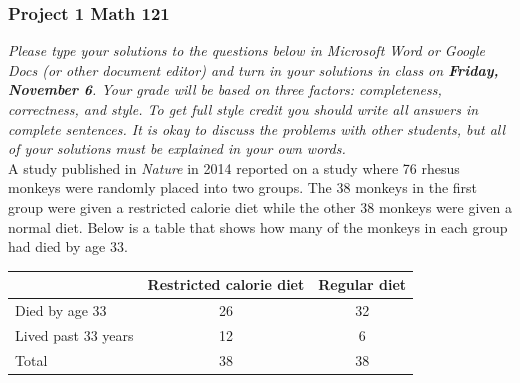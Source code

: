\documentclass[12pt]{exam}
\begin{document}
\subsubsection*{Project 1 \hfill Math 121}

\textit{Please type your solutions to the questions below in Microsoft Word or Google Docs (or other document editor) and turn in your solutions in class on \textbf{Friday, November 6}. Your grade will be based on three factors: completeness, correctness, and style. To get full style credit you should write all answers in complete sentences. It is okay to discuss the problems with other students, but all of your solutions must be explained in your own words. }  \\


A study published in \emph{Nature} in 2014 reported on a study where 76 rhesus monkeys were randomly placed into two groups. The 38 monkeys in the first group were given a restricted calorie diet while the other 38 monkeys were given a normal diet.  Below is a table that shows how many of the monkeys in each group had died by age 33.

\begin{center}
\begin{tabular}{l|c|c}
~ & Restricted calorie diet & Regular diet \\ \hline
Died by age 33 & 26 & 32 \\
Lived past 33 years & 12 & 6 \\ \hline
Total & 38 & 38
\end{tabular}
\end{center}
\end{document}
